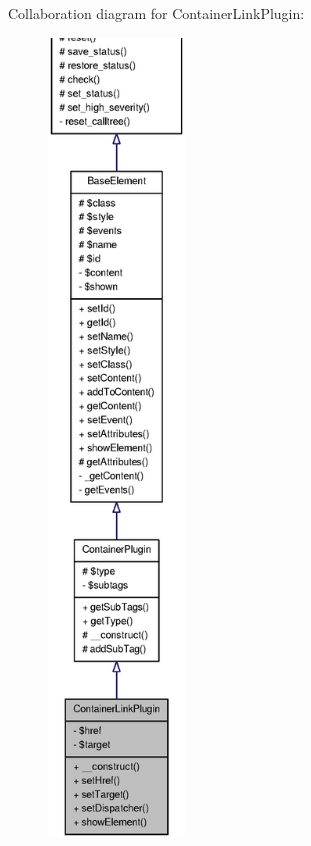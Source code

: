 Collaboration diagram for ContainerLinkPlugin:\nopagebreak
\begin{figure}[H]
\begin{center}
\leavevmode
\includegraphics[height=600pt]{classContainerLinkPlugin__coll__graph}
\end{center}
\end{figure}
